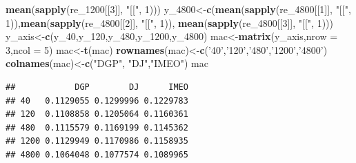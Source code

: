 \documentclass[
]{article}
\newenvironment{Shaded}{\begin{snugshade}}{\end{snugshade}}
\newcommand{\DataTypeTok}[1]{\textcolor[rgb]{0.13,0.29,0.53}{#1}}
\newcommand{\DecValTok}[1]{\textcolor[rgb]{0.00,0.00,0.81}{#1}}
\newcommand{\KeywordTok}[1]{\textcolor[rgb]{0.13,0.29,0.53}{\textbf{#1}}}
\newcommand{\NormalTok}[1]{#1}
\newcommand{\StringTok}[1]{\textcolor[rgb]{0.31,0.60,0.02}{#1}}
\begin{document}
\begin{Shaded}
\begin{Highlighting}[]
        \KeywordTok{mean}\NormalTok{(}\KeywordTok{sapply}\NormalTok{(re_}\DecValTok{1200}\NormalTok{[[}\DecValTok{3}\NormalTok{]], }\StringTok{"[["}\NormalTok{, }\DecValTok{1}\NormalTok{)))}
\NormalTok{y_}\DecValTok{4800}\NormalTok{<-}\KeywordTok{c}\NormalTok{(}\KeywordTok{mean}\NormalTok{(}\KeywordTok{sapply}\NormalTok{(re_}\DecValTok{4800}\NormalTok{[[}\DecValTok{1}\NormalTok{]], }\StringTok{"[["}\NormalTok{, }\DecValTok{1}\NormalTok{)),}\KeywordTok{mean}\NormalTok{(}\KeywordTok{sapply}\NormalTok{(re_}\DecValTok{4800}\NormalTok{[[}\DecValTok{2}\NormalTok{]], }\StringTok{"[["}\NormalTok{, }\DecValTok{1}\NormalTok{)),}
        \KeywordTok{mean}\NormalTok{(}\KeywordTok{sapply}\NormalTok{(re_}\DecValTok{4800}\NormalTok{[[}\DecValTok{3}\NormalTok{]], }\StringTok{"[["}\NormalTok{, }\DecValTok{1}\NormalTok{)))}
\NormalTok{y_axis<-}\KeywordTok{c}\NormalTok{(y_}\DecValTok{40}\NormalTok{,y_}\DecValTok{120}\NormalTok{,y_}\DecValTok{480}\NormalTok{,y_}\DecValTok{1200}\NormalTok{,y_}\DecValTok{4800}\NormalTok{)}
\NormalTok{mac<-}\KeywordTok{matrix}\NormalTok{(y_axis,}\DataTypeTok{nrow =} \DecValTok{3}\NormalTok{,}\DataTypeTok{ncol =} \DecValTok{5}\NormalTok{)}
\NormalTok{mac<-}\KeywordTok{t}\NormalTok{(mac)}
\KeywordTok{rownames}\NormalTok{(mac)<-}\KeywordTok{c}\NormalTok{(}\StringTok{'40'}\NormalTok{,}\StringTok{'120'}\NormalTok{,}\StringTok{'480'}\NormalTok{,}\StringTok{'1200'}\NormalTok{,}\StringTok{'4800'}\NormalTok{)}
\KeywordTok{colnames}\NormalTok{(mac)<-}\KeywordTok{c}\NormalTok{(}\StringTok{"DGP"}\NormalTok{, }\StringTok{"DJ"}\NormalTok{,}\StringTok{"IMEO"}\NormalTok{)}
\NormalTok{mac}
\end{Highlighting}
\end{Shaded}

\begin{verbatim}
##            DGP        DJ      IMEO
## 40   0.1129055 0.1299996 0.1229783
## 120  0.1108858 0.1205064 0.1160361
## 480  0.1115579 0.1169199 0.1145362
## 1200 0.1129949 0.1170986 0.1158935
## 4800 0.1064048 0.1077574 0.1089965
\end{verbatim}
\end{document}
